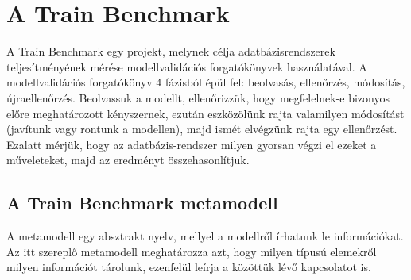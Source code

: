 \chapter{A Train Benchmark}

A Train Benchmark\cite{Szárnyas2017} egy projekt, melynek célja adatbázisrendszerek teljesítményének mérése modellvalidációs forgatókönyvek használatával. A modellvalidációs forgatókönyv 4 fázisból épül fel: beolvasás, ellenőrzés, módosítás, újraellenőrzés. Beolvassuk a modellt, ellenőrizzük, hogy megfelelnek-e bizonyos előre meghatározott kényszernek, ezután eszközölünk rajta valamilyen módosítást (javítunk vagy rontunk a modellen), majd ismét elvégzünk rajta egy ellenőrzést. Ezalatt mérjük, hogy az adatbázis-rendszer milyen gyorsan végzi el ezeket a műveleteket, majd az eredményt összehasonlítjuk.

\section{A Train Benchmark metamodell}

A metamodell egy absztrakt nyelv, mellyel a modellről írhatunk le információkat.\cite{pickametamodeling} Az itt szereplő metamodell meghatározza azt, hogy milyen típusú elemekről milyen információt tárolunk, ezenfelül leírja a közöttük lévő kapcsolatot is.

